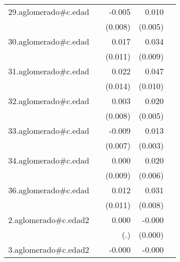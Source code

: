 {\begin{longtable}{l*{4}{D{.}{.}{-1}}}
\addlinespace
29.aglomerado#c.edad&                     &      -0.005         &       0.010\sym{*}  &                     \\
            &                     &     (0.008)         &     (0.005)         &                     \\
\addlinespace
30.aglomerado#c.edad&                     &       0.017         &       0.034\sym{***}&                     \\
            &                     &     (0.011)         &     (0.009)         &                     \\
\addlinespace
31.aglomerado#c.edad&                     &       0.022         &       0.047\sym{***}&                     \\
            &                     &     (0.014)         &     (0.010)         &                     \\
\addlinespace
32.aglomerado#c.edad&                     &       0.003         &       0.020\sym{***}&                     \\
            &                     &     (0.008)         &     (0.005)         &                     \\
\addlinespace
33.aglomerado#c.edad&                     &      -0.009         &       0.013\sym{***}&                     \\
            &                     &     (0.007)         &     (0.003)         &                     \\
\addlinespace
34.aglomerado#c.edad&                     &       0.000         &       0.020\sym{***}&                     \\
            &                     &     (0.009)         &     (0.006)         &                     \\
\addlinespace
36.aglomerado#c.edad&                     &       0.012         &       0.031\sym{***}&                     \\
            &                     &     (0.011)         &     (0.008)         &                     \\
\addlinespace
2.aglomerado#c.edad2&                     &       0.000         &      -0.000\sym{**} &                     \\
            &                     &         (.)         &     (0.000)         &                     \\
\addlinespace
3.aglomerado#c.edad2&                     &      -0.000         &      -0.000\sym{***}&                     \\

\end{longtable}}
